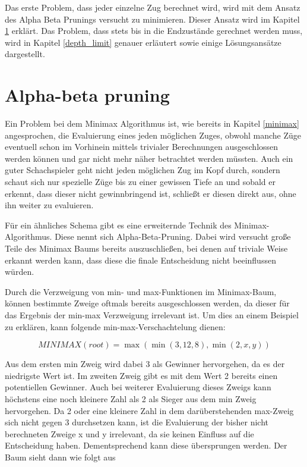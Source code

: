 
Das erste Problem, dass jeder einzelne Zug berechnet wird, wird mit dem Ansatz des Alpha Beta Prunings versucht zu minimieren. Dieser Ansatz wird im Kapitel \ref{alpha_beta} erklärt. Das Problem, dass stets bis in die Endzustände gerechnet werden muss, wird in Kapitel \ref{depth_limit} genauer erläutert sowie einige Lösungsansätze dargestellt.




\section{Alpha-beta pruning}\label{alpha_beta}

Ein Problem bei dem Minimax Algorithmus ist, wie bereits in Kapitel \ref{minimax} angesprochen, die Evaluierung eines jeden möglichen Zuges, obwohl manche Züge eventuell schon im Vorhinein mittels trivialer Berechnungen ausgeschlossen werden können und gar nicht mehr näher betrachtet werden müssten. Auch ein guter Schachspieler geht nicht jeden möglichen Zug im Kopf durch, sondern schaut sich nur spezielle Züge bis zu einer gewissen Tiefe an und sobald er erkennt, dass dieser nicht gewinnbringend ist, schließt er diesen direkt aus, ohne ihn weiter zu evaluieren.

Für ein ähnliches Schema gibt es eine erweiternde Technik des Minimax-Algorithmus. Diese nennt sich Alpha-Beta-Pruning. Dabei wird versucht große Teile des Minimax Baums bereits auszuschließen, bei denen auf triviale Weise erkannt werden kann, dass diese die finale Entscheidung nicht beeinflussen würden. 

Durch die Verzweigung von min- und max-Funktionen im Minimax-Baum, können bestimmte Zweige oftmals bereits ausgeschlossen werden, da dieser für das Ergebnis der min-max Verzweigung irrelevant ist. \cite{Russell2010} Um dies an einem Beispiel zu erklären, kann folgende min-max-Verschachtelung dienen:

\begin{equation}
MINIMAX(root) = \max(\min(3,12,8), \min(2,x,y))
\end{equation}

Aus dem ersten min Zweig wird dabei 3 als Gewinner hervorgehen, da es der niedrigste Wert ist. Im zweiten Zweig gibt es mit dem Wert 2 bereits einen potentiellen Gewinner. Auch bei weiterer Evaluierung dieses Zweigs kann höchstens eine noch kleinere Zahl als 2 als Sieger aus dem min Zweig hervorgehen. Da 2 oder eine kleinere Zahl in dem darüberstehenden max-Zweig sich nicht gegen 3 durchsetzen kann, ist die Evaluierung der bisher nicht berechneten Zweige x und y irrelevant, da sie keinen Einfluss auf die Entscheidung haben. Dementsprechend kann diese übersprungen werden. Der Baum sieht dann wie folgt aus

